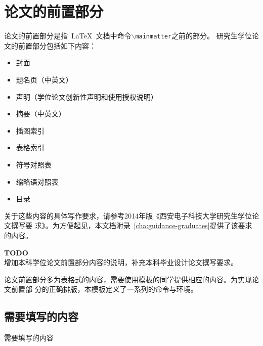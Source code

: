 

\chapter{论文的前置部分}
\label{cha:frontmatter}

论文的前置部分是指~\LaTeX{}~文档中命令\texttt{$\backslash$mainmatter}之前的部分。
研究生学位论文的前置部分包括如下内容：
\begin{itemize}
\item 封面
\item 题名页（中英文）
\item 声明（学位论文创新性声明和使用授权说明）
\item 摘要（中英文）
\item 插图索引
\item 表格索引
\item 符号对照表
\item 缩略语对照表
\item 目录
\end{itemize}
关于这些内容的具体写作要求，请参考2014年版《西安电子科技大学研究生学位论文撰写要
求》。为方便起见，本文档附录~\ref{cha:guidance-graduates}提供了该要求的内容。

{\color{red} \textbf{TODO}\\
  增加本科学位论文前置部分内容的说明，补充本科毕业设计论文撰写要求。}

论文前置部分多为表格式的内容，需要使用模板的同学提供相应的内容。为实现论文前置部
分的正确排版，本模板定义了一系列的命令与环境。

\section{需要填写的内容}
\label{sec:db-commands}

需要填写的内容

